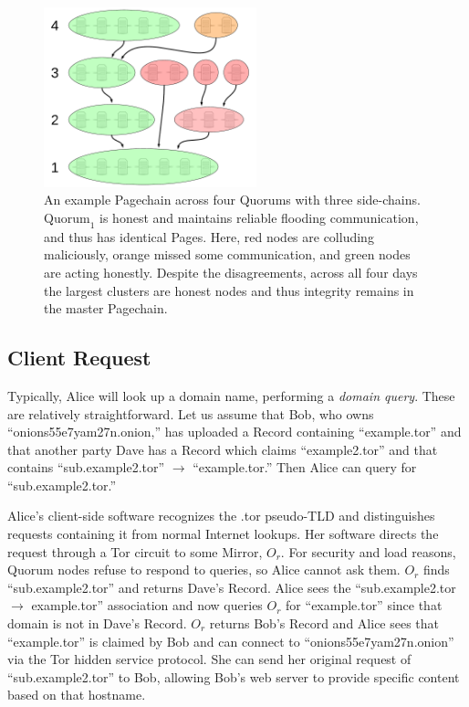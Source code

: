 \begin{figure}[htbp]
	\centering
	\includegraphics[width=0.55\textwidth]{images/LucidCharts/Page-chain2.pdf}
	\caption{An example Pagechain across four Quorums with three side-chains. $ \mathrm{Quorum}_{1} $ is honest and maintains reliable flooding communication, and thus has identical Pages. Here, red nodes are colluding maliciously, orange missed some communication, and green nodes are acting honestly. Despite the disagreements, across all four days the largest clusters are honest nodes and thus integrity remains in the master Pagechain.}
	\label{fig:sidechains}
\end{figure}

\subsection{Client Request}
\label{sec:ClientRequest}

Typically, Alice will look up a domain name, performing a \emph{domain query}. These are relatively straightforward. Let us assume that Bob, who owns ``onions55e7yam27n.onion,'' has uploaded a Record containing ``example.tor'' and that another party Dave has a Record which claims ``example2.tor'' and that contains ``sub.example2.tor'' $ \rightarrow $ ``example.tor.'' Then Alice can query for ``sub.example2.tor.''

Alice's client-side software recognizes the .tor pseudo-TLD and distinguishes requests containing it from normal Internet lookups. Her software directs the request through a Tor circuit to some Mirror, $ O_{r} $. For security and load reasons, Quorum nodes refuse to respond to queries, so Alice cannot ask them. $ O_{r} $ finds ``sub.example2.tor'' and returns Dave's Record. Alice sees the ``sub.example2.tor $ \rightarrow $ example.tor'' association and now queries $ O_{r} $ for ``example.tor'' since that domain is not in Dave's Record. $ O_{r} $ returns Bob's Record and Alice sees that ``example.tor'' is claimed by Bob and can connect to ``onions55e7yam27n.onion'' via the Tor hidden service protocol. She can send her original request of ``sub.example2.tor'' to Bob, allowing Bob's web server to provide specific content based on that hostname.

